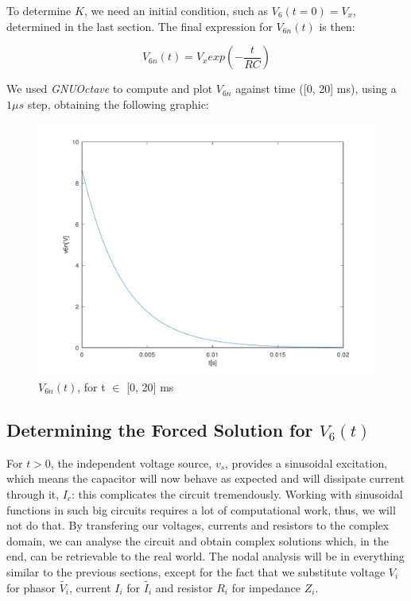 To determine $K$, we need an initial condition, such as $V_6(t=0) = V_x$, determined in the last section. The final expression for $V_{6n}(t)$ is then:

\begin{center}
  \begin{equation}
    V_{6n}(t) = V_x exp\left(-\frac{t}{RC}\right)
  \end{equation} 
\end{center}



We used \textit{GNUOctave} to compute and plot $V_{6n}$ against time ([0, 20] ms), using a $1\mu s$ step, obtaining the following graphic:


\begin{figure}[h] \centering
\includegraphics[width=0.6\linewidth]{../mat/t2-t3.pdf}
\caption{$V_{6n}(t)$, for t $\in$ [0, 20] ms}
\label{fig4}
\end{figure}


\newpage
\subsection{Determining the Forced Solution for $V_6(t)$}

For $t>0$, the independent voltage source, $v_s$, provides a sinusoidal excitation, which means the capacitor will now behave as expected and will dissipate current through it, $I_c$: this complicates the circuit tremendously. Working with sinusoidal functions in such big circuits requires a lot of computational work, thus, we will not do that. By transfering our voltages, currents and resistors to the complex domain, we can analyse the circuit and obtain complex solutions which, in the end, can be retrievable to the real world. The nodal analysis will be in everything similar to the previous sections, except for the fact that we substitute voltage $V_i$ for phasor $\tilde{V_i}$, current $I_i$ for $\tilde{I_i}$ and resistor $R_i$ for impedance $Z_i$.

